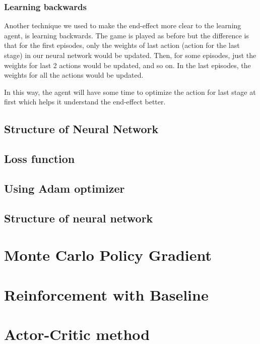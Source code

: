 \documentclass[a4paper,12pt]{article}  %
\theoremstyle{definition}
\begin{document}
	\subsubsection{Learning backwards}
	Another technique we used to make the end-effect more clear to the learning agent, is learning backwards.
	The game is played as before but the difference is that for the first episodes, only the weights of last action (action for the last stage) in our neural network would be updated. Then, for some episodes, just the weights for last 2 actions would be updated, and so on. In the last episodes, the weights for all the actions would be updated.
	
	In this way, the agent will have some time to optimize the action for last stage at first which helps it understand the end-effect better.
	
	
	\subsection{Structure of Neural Network}
	
	\subsection{Loss function}
	
	\subsection{Using Adam optimizer}
	
	
	\subsection{Structure of neural network}
	
	\section{Monte Carlo Policy Gradient}
	
	\section{Reinforcement with Baseline}
	
	\section{Actor-Critic method}
		
	

	
	\small
	
	 
	
\end{document}

